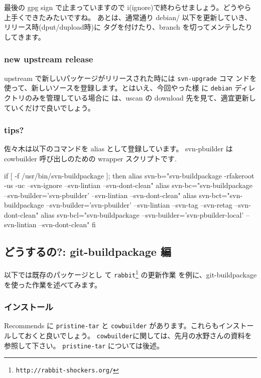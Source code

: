 \documentclass[mingoth,a4paper]{jsarticle}
\begin{document}
最後の gpg sign で止まっていますので i(ignore)で終わらせましょう。どうやら上手くできたみたいですね。
あとは、通常通り debian/ 以下を更新していき、リリース時(dput/dupload時)に
タグを付けたり、branch を切ってメンテしたりしてきます。

\subsubsection{new upstream release}

upstream で新しいパッケージがリリースされた時には {\tt{svn-upgrade}} コマ
ンドを使って、新しいソースを登録します。とはいえ、今回やった様
に {\tt{debian}} ディレクトリのみを管理している場合に
は、uscan の download 先を見て、適宜更新していくだけで良いでしょう。

\subsubsection{tips?}

佐々木は以下のコマンドを alias として登録しています。
svn-pbuilder は cowbuilder 呼び出しのための wrapper スクリプトです.
\begin{commandline}
if [ -f /usr/bin/svn-buildpackage ]; then
  alias svn-b="svn-buildpackage -rfakeroot -us -uc --svn-ignore --svn-lintian --svn-dont-clean"
  alias svn-bc="svn-buildpackage --svn-builder='svn-pbuilder' --svn-lintian --svn-dont-clean"
  alias svn-bct="svn-buildpackage --svn-builder='svn-pbuilder' --svn-lintian --svn-tag --svn-retag --svn-dont-clean"
  alias svn-bcl="svn-buildpackage --svn-builder='svn-pbuilder-local' --svn-lintian --svn-dont-clean"
fi
\end{commandline}

\subsection{どうするの?: git-buildpackage 編}

以下では既存のパッケージとし
て {\tt{rabbit}}\footnote{{\tt{http://rabbit-shockers.org/}}} の更新作業
を例に、git-buildpackage を使った作業を述べてみます。

\subsubsection{インストール}

\begin{commandline}
\end{commandline}
Recommends に {\tt{pristine-tar}} と {\tt{cowbuilder}} があります。これらもインストールしておくと良いでしょう。
{\tt{cowbuilder}}に関しては、先月の水野さんの資料を参照して下さい。
{\tt{pristine-tar}} については後述。
\end{document}
